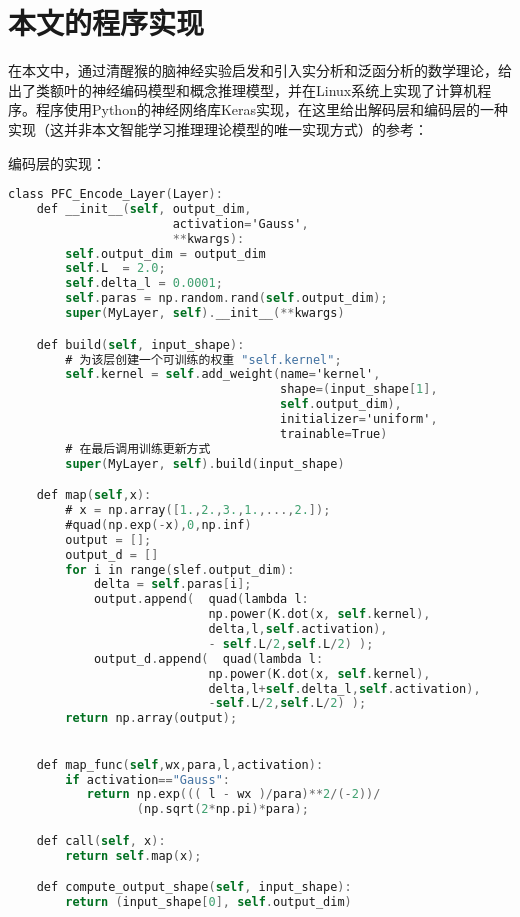 \section{本文的程序实现}
在本文中，通过清醒猴的脑神经实验启发和引入实分析和泛函分析的数学理论，给出了类额叶的神经编码模型和概念推理模型，并在Linux系统上实现了计算机程序。程序使用Python的神经网络库Keras实现，在这里给出解码层和编码层的一种实现（这并非本文智能学习推理理论模型的唯一实现方式）的参考：

编码层的实现：

\begin{lstlisting}[language=C, caption=编码层的实现代码, label={code:first-code}]
class PFC_Encode_Layer(Layer):
    def __init__(self, output_dim, 
                       activation='Gauss', 
                       **kwargs):
        self.output_dim = output_dim
        self.L  = 2.0;
        self.delta_l = 0.0001;
        self.paras = np.random.rand(self.output_dim);
        super(MyLayer, self).__init__(**kwargs)

    def build(self, input_shape):
        # 为该层创建一个可训练的权重 "self.kernel";
        self.kernel = self.add_weight(name='kernel', 
                                      shape=(input_shape[1], 
                                      self.output_dim),
                                      initializer='uniform',
                                      trainable=True)
        # 在最后调用训练更新方式
        super(MyLayer, self).build(input_shape) 

    def map(self,x):
        # x = np.array([1.,2.,3.,1.,...,2.]);
        #quad(np.exp(-x),0,np.inf)
        output = [];
        output_d = []
        for i in range(slef.output_dim):
            delta = self.paras[i];
            output.append(  quad(lambda l:
                            np.power(K.dot(x, self.kernel),
                            delta,l,self.activation),
                            - self.L/2,self.L/2) );
            output_d.append(  quad(lambda l:
                            np.power(K.dot(x, self.kernel),
                            delta,l+self.delta_l,self.activation),
                            -self.L/2,self.L/2) );
        return np.array(output);

    
    def map_func(self,wx,para,l,activation):
        if activation=="Gauss":
           return np.exp((( l - wx )/para)**2/(-2))/
                  (np.sqrt(2*np.pi)*para);

    def call(self, x):
        return self.map(x);

    def compute_output_shape(self, input_shape):
        return (input_shape[0], self.output_dim)        
\end{lstlisting}

